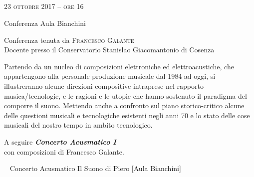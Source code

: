 \documentclass[9pt,
			   twoside
			   ]{extreport}
\title{\flushright{
	\svolk{\large CONSERVATORIO DI MUSICA S. CECILIA} \\
	\vspace{.1em}
	\fontsize{48}{48}
	\svolk{\emph{EMUFest 2017}}} \\
		\svolk{OTTOBRE 2017 \\
		ROMA}}
\author{}
\date{}
\begin{document}
\pagestyle{empty}
\maketitle 


\begin{flushright}

\large{
	\scshape{
	23 ottobre 2017 -- ore 16
	}}

\medskip
	
\small{Conferenza
	\newline Aula Bianchini}

\medskip

{\fontsize{18}{18} }

\normalfont

\normalsize

\bigskip

Conferenza tenuta da \textsc{Francesco Galante}\\{\footnotesize Docente presso il Conservatorio Stanislao Giacomantonio di Cosenza}

\bigskip

Partendo da un nucleo di composizioni elettroniche ed elettroacustiche, che appartengono alla personale produzione musicale dal 1984 ad oggi, si illustreranno alcune  direzioni compositive intraprese nel rapporto musica/tecnologie, e le ragioni e le utopie  che hanno sostenuto il paradigma del comporre il suono. Mettendo anche a confronto sul piano storico-critico alcune delle questioni musicali e tecnologiche esistenti negli anni 70 e lo stato delle cose musicali del nostro tempo in ambito tecnologico.

\bigskip

A seguire \textbf{\emph{Concerto Acusmatico I}}\\
con composizioni di Francesco Galante.



~\vfill
%
%	
\small{Concerto Acusmatico
	\newline Il Suono di Piero [Aula Bianchini]}

\medskip


{\fontsize{20}{20} }


\end{flushright}
\end{document}
